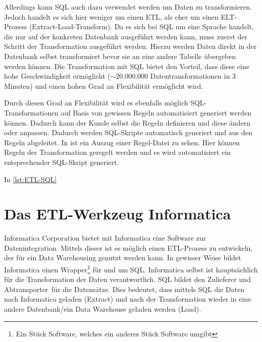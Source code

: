 Allerdings kann SQL auch dazu verwendet werden um Daten zu transformieren. Jedoch handelt es sich hier weniger um einen ETL, als eher um einen ELT-Prozess (Extract-Load-Transform). Da es sich bei SQL um eine Sprache handelt, die nur auf der konkreten Datenbank ausgeführt werden kann, muss zuerst der Schritt der Transformation ausgeführt werden. Hierzu werden Daten direkt in der Datenbank selbst transformiert bevor sie an eine andere Tabelle übergeben werden können. Die Transformation mit SQL bietet den Vorteil, dass diese eine hohe Geschwindigkeit ermöglicht ($\sim 20.000.000$ Datentransformationen in 3 Minuten) und einen hohen Grad an Flexibilität ermöglicht wird.

Durch diesen Grad an Flexibilität wird es ebenfalls möglich SQL-Transformationen auf Basis von gewissen Regeln automatisiert generiert werden können. Dadurch kann der Kunde selbst die Regeln definieren und diese ändern oder anpassen. Dadurch werden SQL-Skripte automatisch generiert und aus den Regeln abgeleitet. 
In %
ist ein Auszug einer Regel-Datei zu sehen. Hier können Regeln der Transformation geregelt werden und es wird automatisiert ein entsprechender SQL-Skript generiert. 

In \autoref{lst:ETL-SQL}

\cite{ITEW:Alex_02-08}\cite{Wikipedia:SQL}\cite{Hempel:SQL}\cite{Huckert:VL1_2}\cite{SQLORA:Data_Historization}
\section{Das ETL-Werkzeug Informatica}
Informatica Corporation \textsuperscript{\textcopyright} bietet mit Informatica eine Software zur Datenintegration. Mittels dieser ist es möglich einen ETL-Prozess zu entwickeln, der für ein Data Warehousing genutzt werden kann. In gewisser Weise bildet Informatica einen Wrapper\footnote{\glqq Ein Stück Software, welches ein anderes Stück Software umgibt\grqq\cite{Wikipedia:Wrapper}} für und um SQL. Informatica selbst ist hauptsächlich für die Transformation der Daten verantwortlich. SQL bildet den \glqq Zulieferer und Abtransporter\grqq~für die Datensätze. Dies bedeutet, dass mittels SQL die Daten nach Informatica geladen (Extract) und nach der Transformation wieder in eine andere  Datenbank/ein Data Warehouse geladen werden (Load).

